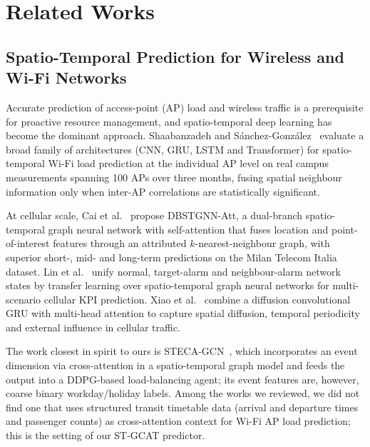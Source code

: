 \section{Related Works}
\label{sec:related}

\subsection{Spatio-Temporal Prediction for Wireless and Wi-Fi Networks}
Accurate prediction of access-point (AP) load and wireless traffic is a prerequisite for proactive resource management, and spatio-temporal deep learning has become the dominant approach. Shaabanzadeh and S\'anchez-Gonz\'alez~\cite{shaabanzadeh2024} evaluate a broad family of architectures (CNN, GRU, LSTM and Transformer) for spatio-temporal Wi-Fi load prediction at the individual AP level on real campus measurements spanning 100 APs over three months, fusing spatial neighbour information only when inter-AP correlations are statistically significant.

At cellular scale, Cai et al.~\cite{cai2024} propose DBSTGNN-Att, a dual-branch spatio-temporal graph neural network with self-attention that fuses location and point-of-interest features through an attributed $k$-nearest-neighbour graph, with superior short-, mid- and long-term predictions on the Milan Telecom Italia dataset. Lin et al.~\cite{lin2024} unify normal, target-alarm and neighbour-alarm network states by transfer learning over spatio-temporal graph neural networks for multi-scenario cellular KPI prediction. Xiao et al.~\cite{xiao2025} combine a diffusion convolutional GRU with multi-head attention to capture spatial diffusion, temporal periodicity and external influence in cellular traffic.

The work closest in spirit to ours is STECA-GCN~\cite{liu2024stgnn}, which incorporates an event dimension via cross-attention in a spatio-temporal graph model and feeds the output into a DDPG-based load-balancing agent; its event features are, however, coarse binary workday/holiday labels. Among the works we reviewed, we did not find one that uses structured transit timetable data (arrival and departure times and passenger counts) as cross-attention context for Wi-Fi AP load prediction; this is the setting of our ST-GCAT predictor.

